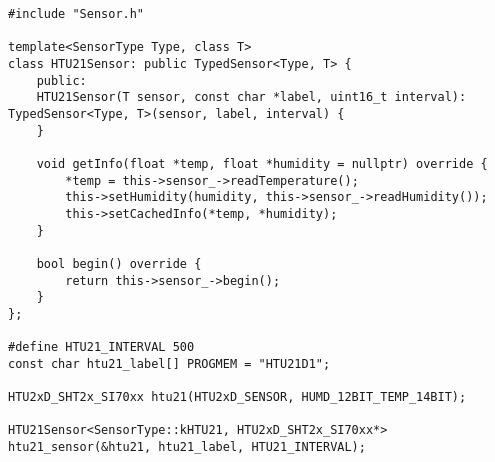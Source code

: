 \begin{lstlisting}[style=cpp-small, caption=Клас-спадок базового класу Sensor для роботи з датчиком HTU21D, label=lst:htu21_sensor]
#include "Sensor.h"

template<SensorType Type, class T>
class HTU21Sensor: public TypedSensor<Type, T> {
    public:
    HTU21Sensor(T sensor, const char *label, uint16_t interval): TypedSensor<Type, T>(sensor, label, interval) {
    }

    void getInfo(float *temp, float *humidity = nullptr) override {
        *temp = this->sensor_->readTemperature();
        this->setHumidity(humidity, this->sensor_->readHumidity());
        this->setCachedInfo(*temp, *humidity);
    }

    bool begin() override {
        return this->sensor_->begin();
    }
};

#define HTU21_INTERVAL 500
const char htu21_label[] PROGMEM = "HTU21D1";

HTU2xD_SHT2x_SI70xx htu21(HTU2xD_SENSOR, HUMD_12BIT_TEMP_14BIT);

HTU21Sensor<SensorType::kHTU21, HTU2xD_SHT2x_SI70xx*> htu21_sensor(&htu21, htu21_label, HTU21_INTERVAL);
\end{lstlisting}

